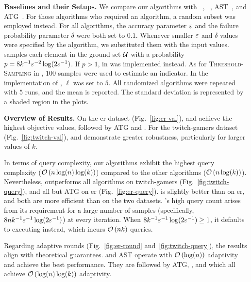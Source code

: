 \textbf{Baselines and their Setups.}
We compare our algorithms with \frg~\citep{DBLP:journals/mor/BuchbinderFS17}, 
\anm~\citep{fahrbach2018non},
\textsc{AST}~\citep{Chen2024}, and \textsc{ATG}~\citep{Chen2024}.
For those algorithms who required an \unc algorithm,
a random subset was employed instead.
For all algorithms, the accuracy parameter $\varepsilon$ and
the failure probability parameter $\delta$ were both set to $0.1$.
Whenever smaller $\varepsilon$ and $\delta$ values were specified by the algorithm, 
we substituted them with the input values.
\frg samples each element in the ground set $\mathcal U$ with
a probability $p = 8k^{-1}\varepsilon^{-2}\log(2\varepsilon^{-1})$.
If $p > 1$, \randomgreedy in \citet{Buchbinder2014a} was implemented instead.
As for \textsc{Threshold-Sampling} in \anm, $100$ samples were used 
to estimate an indicator.
In the implementation of \ptgtwoshort, $\ell$ was set to $5$.
All randomized algorithms were repeated with $5$ runs,
and the mean is reported. 
The standard deviation is represented by a shaded region in the plots.

\textbf{Overview of Results.}
On the er dataset (Fig.~\ref{fig:er-val}), \ptgoneshort and \ptgtwoshort achieve the highest objective values, 
followed by \textsc{ATG} and \frg.
For the twitch-gamers dataset (Fig.~\ref{fig:twitch-val}), 
\ptgoneshort and \ptgtwoshort 
demonstrate greater robustness, particularly for larger values of $k$.

In terms of query complexity, our algorithms exhibit the highest query complexity ($\mathcal O \left( n\log(n) \log(k) \right)$) compared to the other algorithms ($\mathcal O \left( n\log(k) \right)$).
Nevertheless, \ptgoneshort outperforms all algorithms on twitch-gamers (Fig.~\ref{fig:twitch-query}),
and all but \textsc{ATG} on er (Fig.~\ref{fig:er-query}).
\ptgtwoshort is slightly better than \anm on er,
and both are more efficient than \frg on the two datasets.
\frg's high query count arises from its requirement for a large number of samples (specifically, $8nk^{-1}\varepsilon^{-1}\log(2\varepsilon^{-1})$) at every iteration.
When $8k^{-1}\varepsilon^{-1}\log(2\varepsilon^{-1}) \ge 1$, it defaults to executing \rg instead,
which incurs $\mathcal O \left( nk \right)$ queries.

Regarding adaptive rounds (Fig.~\ref{fig:er-round} and~\ref{fig:twitch-query}),
the results align with theoretical guarantees.
\anm and \textsc{AST} operate with
$\mathcal O \left( \log(n) \right)$ adaptivity
and achieve the best performance.
They are followed by \textsc{ATG}, \ptgoneshort, and \ptgtwoshort
which all achieve $\mathcal O \left( \log(n)\log(k) \right)$ adaptivity.